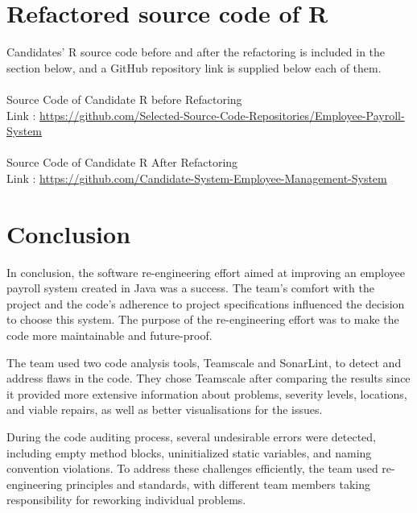 \documentclass[12pt,english]{article}
\begin{document}
\section{Refactored source code of R}
Candidates' R source code before and after the refactoring is included in the section below, and a GitHub repository link is supplied below each of them. \\\\
Source Code of Candidate R before Refactoring \\
Link : \href{https://github.com/mahavir0/DEJA-VU---SOEN-6431-SCM/tree/master/Selected%20Source%20Code%20Repositories/Employee-Payroll-System}{https://github.com/Selected-Source-Code-Repositories/Employee-Payroll-System}\\\\
Source Code of Candidate R After Refactoring \\
Link : \href{https://github.com/mahavir0/DEJA-VU---SOEN-6431-SCM/tree/master/Candidate%20System%20Employee%20Management%20System}{https://github.com/Candidate-System-Employee-Management-System}

\section{Conclusion}
In conclusion, the software re-engineering effort aimed at improving an employee payroll system created in Java was a success. The team's comfort with the project and the code's adherence to project specifications influenced the decision to choose this system. The purpose of the re-engineering effort was to make the code more maintainable and future-proof.

\vspace{0.5cm}

The team used two code analysis tools, Teamscale and SonarLint, to detect and address flaws in the code. They chose Teamscale after comparing the results since it provided more extensive information about problems, severity levels, locations, and viable repairs, as well as better visualisations for the issues.

\vspace{0.5cm}

During the code auditing process, several undesirable errors were detected, including empty method blocks, uninitialized static variables, and naming convention violations. To address these challenges efficiently, the team used re-engineering principles and standards, with different team members taking responsibility for reworking individual problems.
\end{document}
